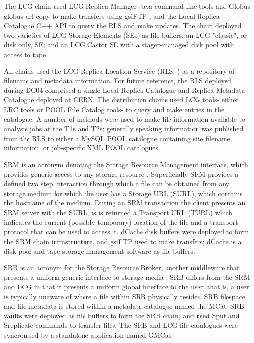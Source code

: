 \documentclass{cmspaper}
\begin{document}
The LCG chain used LCG Replica Manager Java command line tools
\cite{rmapi} and Globus globus-url-copy \cite{globus} to make
transfers using gsiFTP \cite{gsiftp}, and the Local Replica Catalogue
C++ API \cite{rmapi} to query the RLS and make updates. The chain
deployed two varieties of LCG Storage Elements (SEs) as file buffers:
an LCG "classic", or disk only, SE; and an LCG Castor SE with a
stager-managed disk pool with access to tape.

All chains used the LCG Replica Location Service (RLS: \cite{rls}) as
a repository of filename and metadata information. For future
reference, the RLS deployed during DC04 comprised a single Local
Replica Catalogue and Replica Metadata Catalogue deployed at CERN. The
distribution chains used LCG tools- either LRC tools or POOL
\cite{POOL} File Catalog tools- to query and make entries in the
catalogue. A number of methods were used to make file information
available to analysis jobs at the T1s and T2s; generally speaking
information was published from the RLS to either a MySQL POOL catalogue
containing site filename information, or job-specific XML POOL
catalogues.


SRM is an acronym denoting the Storage Resource Management interface,
which provides generic access to any storage resource
\cite{srm}. Superficially SRM provides a defined two step interaction
through which a file can be obtained from any storage medium for which
the user has a Storage URL (SURL), which contains the hostname of the
medium. During an SRM transaction the client presents an SRM server
with the SURL, is is returned a Transport URL (TURL) which indicates
the current (possibly temporary) location of the file and a transport
protocol that can be used to access it. dCache disk buffers were
deployed to form the SRM chain infrastructure, and gsiFTP used to make
transfers; dCache \cite{dcache} is a disk pool and tape storage
management software as file buffers.

SRB is an acronym for the Storage Resource Broker, another middleware
that presents a uniform generic interface to storage media
\cite{srb}. SRB differs from the SRM and LCG in that it presents a
uniform global interface to the user; that is, a user is typically
unaware of where a file within SRB physically resides. SRB filespace
and file metadata is stored within a metadata catalogue named the
MCat. SRB vaults were deployed as file buffers to form the SRB chain,
and used Sput and Sreplicate commands to transfer files. The SRB and
LCG file catalogues were syncronised by a standalone application named
GMCat.
\end{document}
